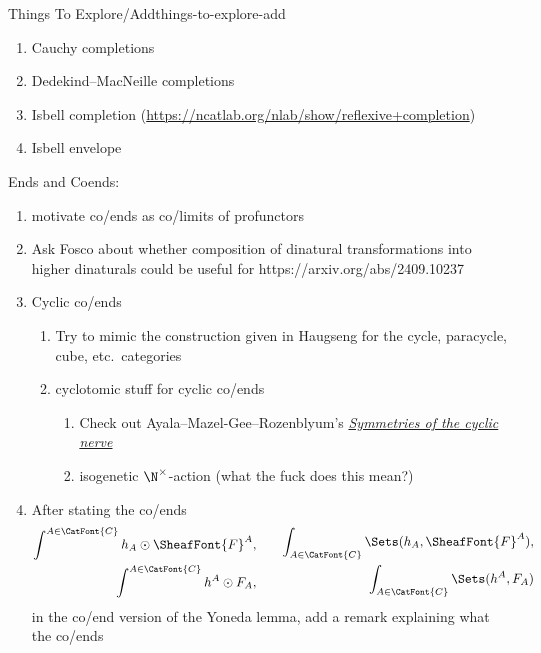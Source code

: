 \begin{remark}{Things To Explore/Add}{things-to-explore-add}
\begin{enumerate}
        \item Cauchy completions
        \item Dedekind--MacNeille completions
        \item Isbell completion (\url{https://ncatlab.org/nlab/show/reflexive+completion})
        \item Isbell envelope
    \end{enumerate}
    Ends and Coends:
    \begin{enumerate}
        \item motivate co/ends as co/limits of profunctors
        \item Ask Fosco about whether composition of dinatural transformations into higher dinaturals could be useful for https://arxiv.org/abs/2409.10237
        \item Cyclic co/ends
            \begin{enumerate}
                \item Try to mimic the construction given in Haugseng for the cycle, paracycle, cube, etc.\ categories
                \item cyclotomic stuff for cyclic co/ends
                    \begin{enumerate}
                        \item Check out Ayala--Mazel-Gee--Rozenblyum's \textit{\href{https://arxiv.org/abs/2405.03897}{Symmetries of the cyclic nerve}}
                        \item isogenetic $\N^{\times}$-action (what the fuck does this mean?)
                    \end{enumerate}
            \end{enumerate}
        \item After stating the co/ends
            \[
                \begin{aligned}
                    \int^{A\in\CatFont{C}}h_{A}\odot\SheafFont{F}^{A},\\
                    \int^{A\in\CatFont{C}}h^{A}\odot F_{A},
                \end{aligned}
                \qquad
                \begin{aligned}
                    \int_{A\in\CatFont{C}}\Sets(h_{A},\SheafFont{F}^{A}),\\
                    \int_{A\in\CatFont{C}}\Sets(h^{A},F_{A})
                \end{aligned}
            \]%
            in the co/end version of the Yoneda lemma, add a remark explaining what the co/ends

\end{enumerate}
\end{remark}
